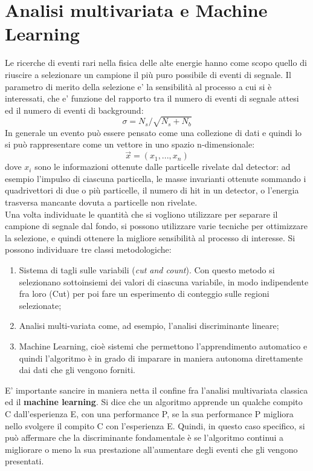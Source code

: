 \section{Analisi multivariata e Machine Learning}
\label{analisi multivariata e ML}

Le ricerche di eventi rari nella fisica delle alte energie hanno come scopo quello di riuscire a selezionare un campione il più puro possibile di eventi di segnale. Il parametro di merito della selezione e' la sensibilità al processo a cui si è interessati, che e' funzione del rapporto tra il numero di eventi di segnale attesi ed il numero di eventi di background: 
\begin{equation}
	\sigma = N_s/\sqrt{N_s + N_b}
\end{equation}
In generale un evento può essere pensato come una collezione di dati e quindi lo si può rappresentare come un vettore in uno spazio n-dimensionale: 
\begin{equation}
\vec{x} = (x_{1},...,x_{n})
\end{equation}
dove $x_i$ sono le informazioni ottenute dalle particelle rivelate dal detector: ad esempio l'impulso di ciascuna particella, le masse invarianti ottenute sommando i quadrivettori di due o più particelle, il numero di hit in un detector, o l'energia trasversa mancante dovuta a particelle non rivelate. \\
Una volta individuate le quantità che si vogliono utilizzare per separare il campione di segnale dal fondo, si possono utilizzare varie tecniche per ottimizzare la selezione, e quindi ottenere la migliore sensibilità al processo di interesse. Si possono individuare tre classi metodologiche:

\begin{enumerate}
	\item Sistema di tagli sulle variabili (\textit{cut and count}). Con questo metodo si selezionano sottoinsiemi dei valori di ciascuna variabile, in modo indipendente fra loro (Cut) per poi fare un esperimento di conteggio sulle regioni selezionate;
	\item Analisi multi-variata come, ad esempio, l'analisi discriminante lineare;
	\item Machine Learning, cioè sistemi che permettono l'apprendimento automatico e quindi l'algoritmo è in grado di imparare in maniera autonoma direttamente dai dati che gli vengono forniti.
\end{enumerate}
E' importante sancire in maniera netta il confine fra l'analisi multivariata classica ed il \textbf{machine learning}. Si dice che un algoritmo apprende un qualche compito C dall'esperienza E, con una performance P, se la sua performance P migliora nello svolgere il compito C con l'esperienza E. Quindi, in questo caso specifico, si può affermare che la discriminante fondamentale è se l'algoritmo continui a migliorare o meno la sua prestazione all'aumentare degli eventi che gli vengono presentati.

